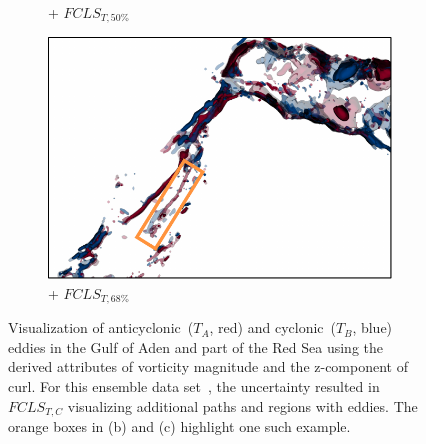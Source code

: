 \begin{figure}[!h]
\begin{subfigure}{0.245\linewidth}
\vspace{-3mm}
\caption{+ $FCLS_{T,50\%}$}
\label{fig:rse_fls}
\end{subfigure}
\begin{subfigure}{0.245\linewidth}
\centering
\includegraphics[width=\linewidth]{Images/RedSeaEddy/fcls_68.pdf}
\vspace{-3mm}
\caption{+ $FCLS_{T,68\%}$}
\label{fig:rse_fcls}
\end{subfigure}
\vspace{-2mm}
\caption{Visualization of anticyclonic~($T_{A}$, red) and cyclonic~($T_{B}$, blue) eddies in the Gulf of Aden and part of the Red Sea using the derived attributes of vorticity magnitude and the z-component of curl. For this ensemble data set~\cite{sanikommu2020impact}, the uncertainty resulted in $FCLS_{T,C}$ visualizing additional paths and regions with eddies. The orange boxes in (b) and (c) highlight one such example.}
\label{fig:rse}
\end{figure}
